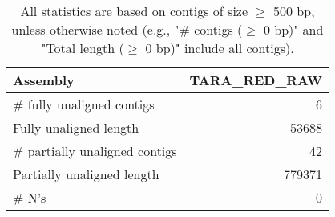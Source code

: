 \documentclass[12pt,a4paper]{article}
\begin{document}
\begin{table}[ht]
\begin{center}
\caption{All statistics are based on contigs of size $\geq$ 500 bp, unless otherwise noted (e.g., "\# contigs ($\geq$ 0 bp)" and "Total length ($\geq$ 0 bp)" include all contigs).}
\begin{tabular}{|l*{1}{|r}|}
\hline
Assembly & TARA\_RED\_RAW \\ \hline
\# fully unaligned contigs & 6 \\ \hline
Fully unaligned length & 53688 \\ \hline
\# partially unaligned contigs & 42 \\ \hline
Partially unaligned length & 779371 \\ \hline
\# N's & 0 \\ \hline
\end{tabular}
\end{center}
\end{table}
\end{document}
